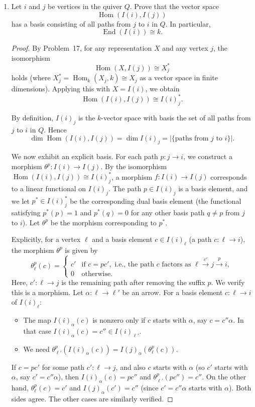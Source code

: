 \documentclass[11pt, a4paper]{article}
\begin{document}
\begin{enumerate}[leftmargin=*, label=\textbf{\arabic*.}]
\item Let $i$ and $j$ be vertices in the quiver $Q$. Prove that the vector space
\[
\operatorname{Hom}(I(i),I(j))
\]
has a basis consisting of all paths from $j$ to $i$ in $Q$. In particular,
\[
\operatorname{End}(I(i)) \cong k.
\]

\begin{proof}
    By Problem~17, for any representation $X$ and any vertex $j$, the isomorphism
    \[
    \operatorname{Hom}(X,I(j))\cong X_j^*
    \]
    holds (where $X_j^*=\operatorname{Hom}_k(X_j,k)\cong X_j$ as a vector space in finite dimensions). Applying this with $X=I(i)$, we obtain
    \[
    \operatorname{Hom}(I(i),I(j))\cong I(i)_j^*.
    \]
    
    By definition, $I(i)_j$ is the $k$-vector space with basis the set of all paths from $j$ to $i$ in $Q$. Hence
    \[
    \dim\operatorname{Hom}(I(i),I(j)) = \dim I(i)_j = |\{\text{paths from } j \text{ to } i\}|.
    \]
    
    We now exhibit an explicit basis. For each path $p\colon j\to i$, we construct a morphism $\theta^p\colon I(i)\to I(j)$. By the isomorphism $\operatorname{Hom}(I(i),I(j))\cong I(i)_j^*$, a morphism $f\colon I(i)\to I(j)$ corresponds to a linear functional on $I(i)_j$. The path $p\in I(i)_j$ is a basis element, and we let $p^*\in I(i)_j^*$ be the corresponding dual basis element (the functional satisfying $p^*(p)=1$ and $p^*(q)=0$ for any other basis path $q\neq p$ from $j$ to $i$). Let $\theta^p$ be the morphism corresponding to $p^*$.
    
    Explicitly, for a vertex $\ell$ and a basis element $c\in I(i)_\ell$ (a path $c\colon\ell\to i$), the morphism $\theta^p$ is given by
    \[
    \theta^p_\ell(c)=
    \begin{cases}
    c' & \text{if } c=pc', \text{ i.e., the path } c \text{ factors as } \ell\xrightarrow{c'} j\xrightarrow{p} i,\\
    0 & \text{otherwise.}
    \end{cases}
    \]
    Here, $c'\colon\ell\to j$ is the remaining path after removing the suffix $p$. We verify this is a morphism. Let $\alpha\colon\ell\to\ell'$ be an arrow. For a basis element $c\colon\ell\to i$ of $I(i)_\ell$:
    \begin{itemize}
    \item The map $I(i)_\alpha(c)$ is nonzero only if $c$ starts with $\alpha$, say $c=c''\alpha$. In that case $I(i)_\alpha(c)=c''\in I(i)_{\ell'}$.
    \item We need $\theta^p_{\ell'}(I(i)_\alpha(c))=I(j)_\alpha(\theta^p_\ell(c))$.
    \end{itemize}
    If $c=pc'$ for some path $c'\colon\ell\to j$, and also $c$ starts with $\alpha$ (so $c'$ starts with $\alpha$, say $c'=c''\alpha$), then $I(i)_\alpha(c)=pc''$ and $\theta^p_{\ell'}(pc'')=c''$. On the other hand, $\theta^p_\ell(c)=c'$ and $I(j)_\alpha(c')=c''$ (since $c'=c''\alpha$ starts with $\alpha$). Both sides agree. The other cases are similarly verified.
    

\end{proof}
\end{enumerate}
\end{document}
